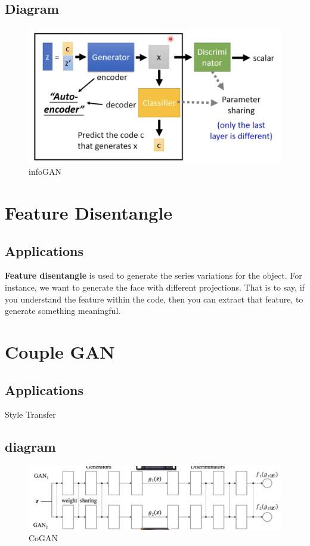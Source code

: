 \documentclass{article}
\begin{document}
\begin{itemize}
\subsection{Diagram}
\begin{figure}
    \centering
    \includegraphics[width=\linewidth]{infoGAN}
    \caption{infoGAN}
\end{figure}
\section{Feature Disentangle}
\subsection{Applications}
\textbf{Feature disentangle} is used to generate the series variations for the object. For instance, we want to generate the face with different projections. That is to say, if you understand the feature within the code, then you can extract that feature, to generate something meaningful.
\section{Couple GAN}
\subsection{Applications}
Style Transfer
\subsection{diagram}
\begin{figure}[H]
    \centering
    \includegraphics[width=\linewidth]{coGAN}
    \caption{CoGAN}
\end{figure}

\end{itemize}
\end{document}
